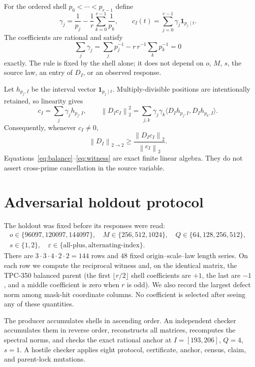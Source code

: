 \documentclass[10pt]{article}
\newcommand{\norm}[1]{\left\lVert #1\right\rVert}
\newcommand{\ind}[1]{\mathbf{1}_{#1}}
\begin{document}
For the ordered shell $p_0<\cdots<p_{r-1}$ define
\begin{equation}
 \gamma_j=\frac1{p_j}-\frac1r\sum_{k=0}^{r-1}\frac1{p_k},
 \qquad c_I(t)=\sum_{j=0}^{r-1}\gamma_j\ind{p_j\mid t}.
 \label{eq:gamma}
\end{equation}
The coefficients are rational and satisfy
\begin{equation}
 \sum_j\gamma_j=\sum_jp_j^{-1}-r\,r^{-1}\sum_kp_k^{-1}=0
 \label{eq:balance}
\end{equation}
exactly.  The rule is fixed by the shell alone; it does not depend on $o$,
$M$, $s$, the source law, an entry of $D_I$, or an observed response.

Let $h_{p_j,I}$ be the interval vector $\ind{p_j\mid t}$.  Multiply-divisible
positions are intentionally retained, so linearity gives
\[
 c_I=\sum_j\gamma_jh_{p_j,I},\qquad
 \norm{D_Ic_I}_2^2
 =\sum_{j,k}\gamma_j\gamma_k
 \langle D_Ih_{p_j,I},D_Ih_{p_k,I}\rangle.
 \label{eq:gram}
\]
Consequently, whenever $c_I\ne0$,
\begin{equation}
 \norm{D_I}_{2\to2}\geq
 \frac{\norm{D_Ic_I}_2}{\norm{c_I}_2}.
 \label{eq:witness}
\end{equation}
Equations~\eqref{eq:balance}--\eqref{eq:witness} are exact finite linear
algebra.  They do not assert cross-prime cancellation in the source variable.

\section{Adversarial holdout protocol}

The holdout was fixed before its responses were read:
\[
\begin{gathered}
 o\in\{96097,120097,144097\},\quad
 M\in\{256,512,1024\},\quad
 Q\in\{64,128,256,512\},\\
 s\in\{1,2\},\quad
 \varepsilon\in\{\text{all-plus},\text{alternating-index}\}.
\end{gathered}
\]
There are $3\cdot3\cdot4\cdot2\cdot2=144$ rows and $48$ fixed
origin--scale--law length series.  On each row we compute the reciprocal
witness and, on the identical matrix, the TPC-350 balanced parent (the first
$\lfloor r/2\rfloor$ shell coefficients are $+1$, the last are $-1$, and a
middle coefficient is zero when $r$ is odd).  We also record the largest
defect norm among mask-hit coordinate columns.  No coefficient is selected
after seeing any of these quantities.

The producer accumulates shells in ascending order.  An independent checker
accumulates them in reverse order, reconstructs all matrices, recomputes the
spectral norms, and checks the exact rational anchor at $I=[193,206]$,
$Q=4$, $s=1$.  A hostile checker applies eight protocol, certificate, anchor,
census, claim, and parent-lock mutations.
\end{document}
